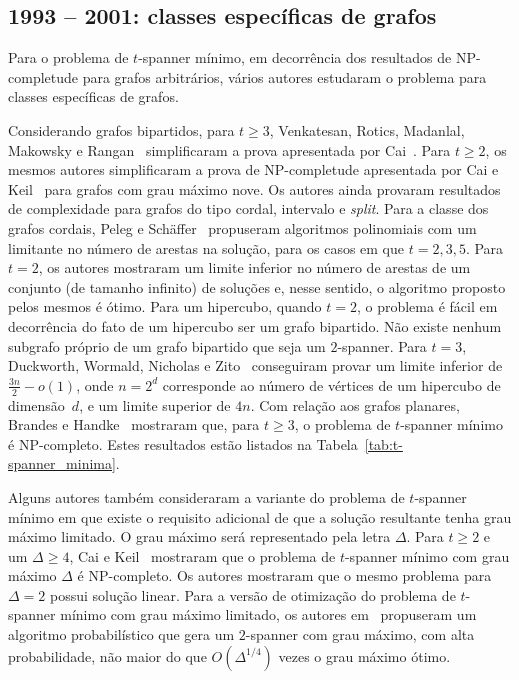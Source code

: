 \subsection{1993 -- 2001: classes específicas de grafos}
Para o problema de $t$-spanner mínimo, em decorrência dos resultados de 
NP-completude para grafos arbitrários,
vários autores estudaram o problema para classes específicas de grafos. 

Considerando grafos bipartidos, para $t \ge 3$, Venkatesan,
Rotics, Madanlal, Makowsky e Rangan~\cite{VenkatesanRMMR1997}
simplificaram a prova apresentada por Cai~\cite{Cai1994}. Para $t \ge 2$, 
os mesmos autores simplificaram a prova de NP-completude apresentada por 
Cai e Keil~\cite{CaiK1994} para grafos com grau máximo nove.
Os autores ainda provaram resultados de complexidade para grafos do tipo cordal, intervalo e \emph{split}. Para a classe dos grafos cordais, Peleg e Schäffer~\cite{PelegS1989} propuseram algoritmos polinomiais com um limitante no número de arestas na solução, para os casos em que $t = 2,3,5$.  Para $t = 2$, os autores mostraram um limite inferior no número de arestas de um conjunto (de tamanho infinito) de soluções e, nesse sentido, o algoritmo proposto pelos mesmos é ótimo.  Para um hipercubo, quando $t = 2$, o problema é fácil em decorrência do fato de um hipercubo ser um grafo bipartido. Não existe nenhum subgrafo próprio de
um grafo bipartido que seja um $2$-spanner. Para $t = 3$, Duckworth, Wormald, Nicholas e Zito~\cite{DuckworthZ2000} conseguiram provar um limite inferior de $\frac{3n}{2} - o(1)$, onde $n = 2^d$ corresponde ao número de vértices de um hipercubo de dimensão~$d$, e um limite superior de $4n$. Com relação aos grafos planares, Brandes e Handke~\cite{BrandesH1997} mostraram que, para $t \ge 3$, o problema de $t$-spanner mínimo é NP-completo. Estes resultados estão listados na Tabela~\ref{tab:t-spanner_minima}.

Alguns autores também consideraram a variante do problema de $t$-spanner mínimo em que existe o requisito adicional de que a solução resultante tenha grau máximo limitado. O grau máximo será representado pela letra $\Delta$.  Para $t \ge 2$ e um $\Delta \ge 4$, Cai e Keil~\cite{CaiK1993} mostraram que o problema de $t$-spanner mínimo com grau máximo $\Delta$ é NP-completo. Os autores mostraram que o mesmo problema para $\Delta = 2$ possui solução linear. Para a versão de otimização do problema de $t$-spanner mínimo com grau máximo limitado, os autores em~\cite{KortsarzP1998} propuseram um algoritmo probabilístico que gera um $2$-spanner com grau máximo, com alta probabilidade, não maior do que $O(\Delta^{1/4})$ vezes o grau máximo ótimo.

